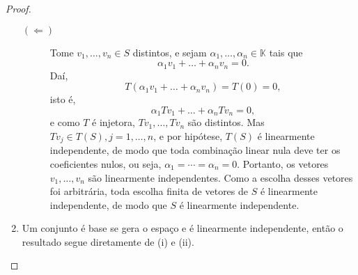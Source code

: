 \documentclass{article}
\newcommand{\K}{\mathbb{K}}
\begin{document}
\begin{proof}
\begin{enumerate}
\begin{description}
      \item[$(\Leftarrow)$]
        Tome $v_1,\dots,v_n \in S$ distintos, e sejam
        $\alpha_1,\dots,\alpha_n\in\K$ tais que
        $$ \alpha_1v_1 + \dots + \alpha_nv_n = 0.$$
        Daí,
        $$ T(\alpha_1v_1 + \dots + \alpha_nv_n) = T(0) = 0,$$
        isto é,
        $$ \alpha_1Tv_1 + \dots + \alpha_nTv_n = 0,$$
        e como $T$ é injetora, $Tv_1,\dots,Tv_n$ são distintos.
        Mas $Tv_j\in T(S), j=1,\dots,n$, e por hipótese, $T(S)$ é linearmente
        independente,
        de modo que toda combinação linear nula deve
        ter os coeficientes nulos, ou seja,
        $\alpha_1 = \cdots = \alpha_n = 0$.
        Portanto, os vetores $v_1,\dots,v_n$ são linearmente independentes.
        Como a escolha desses vetores foi arbitrária, toda escolha finita de
        vetores de $S$ é linearmente independente, de modo que $S$ é
        linearmente independente.
    \end{description}
    \item Um conjunto é base se gera o espaço e é linearmente independente,
      então o resultado segue diretamente de (i) e (ii).
  \end{enumerate}
\end{proof}
\end{document}
